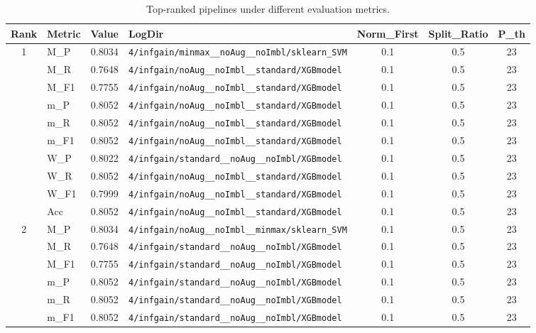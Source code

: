 \begin{table}[htbp]
\caption{Top-ranked pipelines under different evaluation metrics.}
\label{tab:rank_metric_vertical}
\centering
\small
\setlength{\tabcolsep}{4pt}
\begin{tabular}{|c|l|c|>{\ttfamily\footnotesize}p{7.2cm}|c|c|c|}
\hline
Rank & Metric & Value & LogDir & Norm\_First & Split\_Ratio & P\_th \\
\hline
\multirow{10}{*}{1} & M\_P & 0.8034 & \texttt{4/infgain/minmax\_\_noAug\_\_noImbl/sklearn\_SVM} & 0.1 & 0.5  & 23 \\ 
 & M\_R & 0.7648 & \texttt{4/infgain/noAug\_\_noImbl\_\_standard/XGBmodel} & 0.1 & 0.5  & 23 \\ 
 & M\_F1 & 0.7755 & \texttt{4/infgain/noAug\_\_noImbl\_\_standard/XGBmodel} & 0.1 & 0.5  & 23 \\ 
 & m\_P & 0.8052 & \texttt{4/infgain/noAug\_\_noImbl\_\_standard/XGBmodel} & 0.1 & 0.5  & 23 \\ 
 & m\_R & 0.8052 & \texttt{4/infgain/noAug\_\_noImbl\_\_standard/XGBmodel} & 0.1 & 0.5  & 23 \\ 
 & m\_F1 & 0.8052 & \texttt{4/infgain/noAug\_\_noImbl\_\_standard/XGBmodel} & 0.1 & 0.5  & 23 \\ 
 & W\_P & 0.8022 & \texttt{4/infgain/standard\_\_noAug\_\_noImbl/XGBmodel} & 0.1 & 0.5  & 23 \\ 
 & W\_R & 0.8052 & \texttt{4/infgain/noAug\_\_noImbl\_\_standard/XGBmodel} & 0.1 & 0.5  & 23 \\ 
 & W\_F1 & 0.7999 & \texttt{4/infgain/noAug\_\_noImbl\_\_standard/XGBmodel} & 0.1 & 0.5  & 23 \\ 
 & Acc & 0.8052 & \texttt{4/infgain/noAug\_\_noImbl\_\_standard/XGBmodel} & 0.1 & 0.5  & 23 \\ 
\hline
\multirow{10}{*}{2} & M\_P & 0.8034 & \texttt{4/infgain/noAug\_\_noImbl\_\_minmax/sklearn\_SVM} & 0.1 & 0.5  & 23 \\ 
 & M\_R & 0.7648 & \texttt{4/infgain/standard\_\_noAug\_\_noImbl/XGBmodel} & 0.1 & 0.5  & 23 \\ 
 & M\_F1 & 0.7755 & \texttt{4/infgain/standard\_\_noAug\_\_noImbl/XGBmodel} & 0.1 & 0.5  & 23 \\ 
 & m\_P & 0.8052 & \texttt{4/infgain/standard\_\_noAug\_\_noImbl/XGBmodel} & 0.1 & 0.5  & 23 \\ 
 & m\_R & 0.8052 & \texttt{4/infgain/standard\_\_noAug\_\_noImbl/XGBmodel} & 0.1 & 0.5  & 23 \\ 
 & m\_F1 & 0.8052 & \texttt{4/infgain/standard\_\_noAug\_\_noImbl/XGBmodel} & 0.1 & 0.5  & 23 \\ 

\end{tabular}
\end{table}
